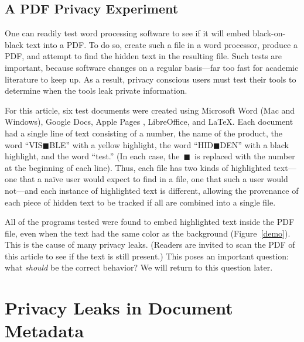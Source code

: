 

\subsection{A PDF Privacy Experiment}
One can readily test word processing software to see if it will embed
black-on-black text into a PDF. To do so, create such a file in a word
processor, produce a PDF, and attempt to find the hidden text in the
resulting file. Such tests are important, because software changes on
a regular basis---far too fast for academic literature to keep up. As
a result, privacy conscious users must test their tools to determine
when the tools leak private information.

For this article, six test documents were created using Microsoft Word
(Mac and Windows), Google Docs, Apple Pages , LibreOffice, and \LaTeX.
Each document had a single line of text consisting of a number, the
name of the product, the word ``VIS$\blacksquare$BLE'' with a yellow
highlight, the word ``HID$\blacksquare$DEN'' with a black
highlight, and the word ``test.'' (In each case, the\ 
$\blacksquare$\ is replaced with the number at the beginning of each line). Thus, each
file has two kinds of highlighted text---one that a na\"ive user would expect to find in
a file, one that such a user would not---and each instance of highlighted
text is different, allowing the provenance of each piece of hidden
text to be tracked if  all are combined into a single file. 

All of the programs tested were found to embed highlighted text inside the
PDF file, even when the text had the same color as the
background (Figure~\ref{demo}). This is the cause of many privacy
leaks. (Readers are invited to scan the PDF of this article to see
if the text is still present.) This poses an important
question: what \emph{should} be the correct behavior?  We will return
to this question later.

\section{Privacy Leaks in Document Metadata}

